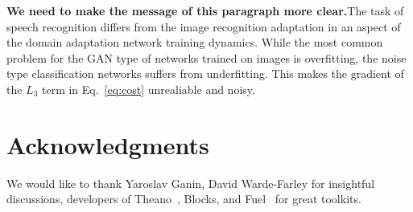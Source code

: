 \documentclass{article}
\begin{document}
    {\bf We need to make the message of this paragraph more clear.}The task of speech recognition differs from the image recognition
    adaptation in an aspect of the domain adaptation network training dynamics. 
    While the most common problem for the GAN type of networks trained on images 
    is overfitting, the noise type classification networks suffers from 
    underfitting. This makes the gradient of the $L_3$ term in Eq.~\ref{eq:cost}
    unrealiable and noisy. 


\section*{Acknowledgments}

We would like to thank Yaroslav Ganin, David Warde-Farley for insightful discussions,
developers of Theano~\cite{2016arXiv160502688short}, Blocks, and Fuel~\cite{MerrienboerBDSW15} 
for great toolkits.

%


\end{document}
